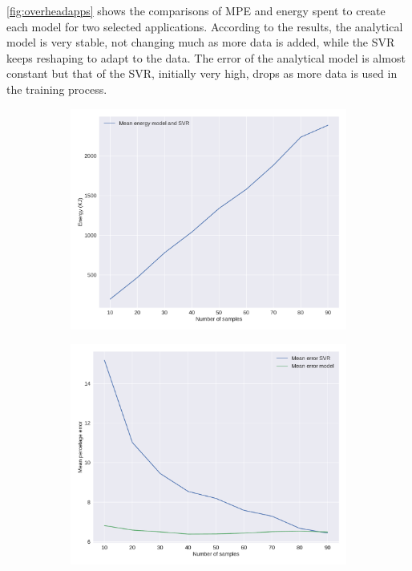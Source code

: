 \cref{fig:overheadapps} shows the comparisons of MPE and energy spent to create each model for two selected applications. According to the results, the analytical model is very stable, not changing much as more data is added, while the SVR keeps reshaping to adapt to the data. 
The error of the analytical model is almost constant but that of the SVR, initially very high, drops as more data is used in the training process.
\begin{figure}[H]
	\centering
	\captionsetup[subfigure]{justification=centering}
	\begin{subfigure}[t]{0.45\textwidth}
		\includegraphics[width=\columnwidth]{models/figures/overhead/overall_energy_10pts.pdf}
		\caption{}
		\label{fig:overall_overhead}
	\end{subfigure}
	\begin{subfigure}[t]{0.45\textwidth}
		\includegraphics[width=\columnwidth]{models/figures/overhead/overall_mpe_10pts.pdf}

\end{subfigure}
\end{figure}
